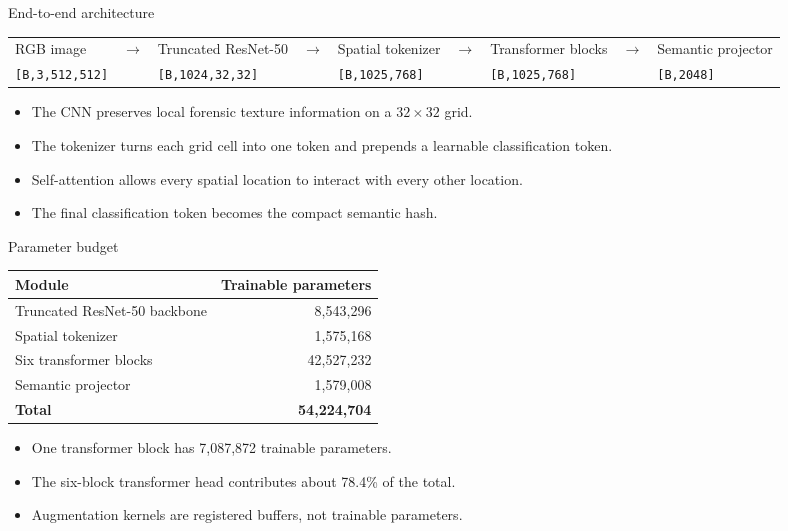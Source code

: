 \documentclass[aspectratio=169,10pt]{beamer}
\newcommand{\shape}[1]{\texttt{#1}}
\begin{document}
\begin{frame}{End-to-end architecture}
  \centering
  \scriptsize
  \setlength{\tabcolsep}{1pt}
  \begin{tabular}{>{\centering\arraybackslash}p{}
                  >{\centering\arraybackslash}p{}
                  >{\centering\arraybackslash}p{}
                  >{\centering\arraybackslash}p{}
                  >{\centering\arraybackslash}p{}
                  >{\centering\arraybackslash}p{}
                  >{\centering\arraybackslash}p{}
                  >{\centering\arraybackslash}p{}
                  >{\centering\arraybackslash}p{}}
    RGB image & $\rightarrow$ & Truncated ResNet-50 & $\rightarrow$ &
    Spatial tokenizer & $\rightarrow$ & 6 Transformer blocks & $\rightarrow$ &
    Semantic projector\\[0.5em]
    \shape{[B,3,512,512]} && \shape{[B,1024,32,32]} &&
    \shape{[B,1025,768]} && \shape{[B,1025,768]} &&
    \shape{[B,2048]}
  \end{tabular}
  \vspace{1em}
  \begin{itemize}
    \item The CNN preserves local forensic texture information on a $32\times32$ grid.
    \item The tokenizer turns each grid cell into one token and prepends a learnable
          classification token.
    \item Self-attention allows every spatial location to interact with every other location.
    \item The final classification token becomes the compact semantic hash.
  \end{itemize}
\end{frame}

\begin{frame}{Parameter budget}
  \centering
  \begin{tabular}{lr}
    \toprule
    Module & Trainable parameters\\
    \midrule
    Truncated ResNet-50 backbone & 8,543,296\\
    Spatial tokenizer & 1,575,168\\
    Six transformer blocks & 42,527,232\\
    Semantic projector & 1,579,008\\
    \midrule
    \textbf{Total} & \textbf{54,224,704}\\
    \bottomrule
  \end{tabular}
  \vspace{0.8em}
  \begin{itemize}
    \item One transformer block has 7,087,872 trainable parameters.
    \item The six-block transformer head contributes about 78.4\% of the total.
    \item Augmentation kernels are registered buffers, not trainable parameters.
  \end{itemize}
\end{frame}
\end{document}
